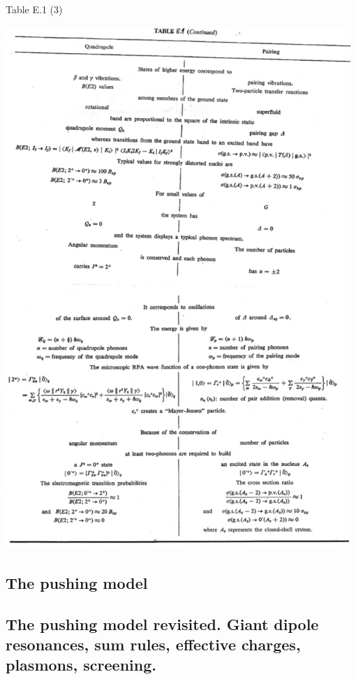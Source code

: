 \documentclass[a4paper,onecolumn,superscriptaddress,12pt,nofootinbib,twoside,raggedfooter,notitlepage]{revtex4-1}
\begin{document}
\pagebreak
Table E.1 (3)
\begin{center}
	\includegraphics[width=0.98\textwidth]{figs/tab_e1_3}
\end{center}




\pagebreak

\subsection{The pushing model}

\pagebreak

\subsection{The pushing model revisited. Giant dipole resonances, sum rules, effective charges, plasmons, screening.}
\end{document}
